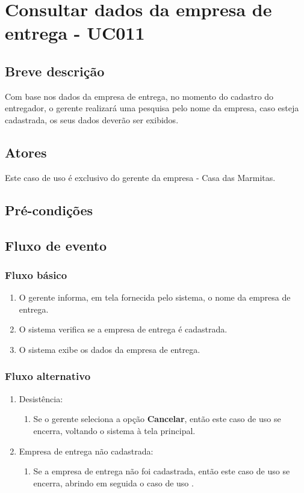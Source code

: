 \chapter{Consultar dados da empresa de entrega - UC011} \label{uc011}

\section{Breve descrição}

Com base nos dados da empresa de entrega, no momento do cadastro do entregador, o gerente realizará uma pesquisa pelo nome da empresa, caso esteja cadastrada, os seus dados deverão ser exibidos.

\section{Atores}

Este caso de uso é exclusivo do gerente da empresa - Casa das Marmitas.

\section{Pré-condições}

\section{Fluxo de evento}

\subsection{Fluxo básico}

\begin{enumerate}
	\item O gerente informa, em tela fornecida pelo sistema, o nome da empresa de entrega.	
	\item O sistema verifica se a empresa de entrega é cadastrada.
	\item O sistema exibe os dados da empresa de entrega.
\end{enumerate}

\subsection{Fluxo alternativo}

\begin{enumerate}
	\item Desistência:
	\begin{enumerate}
		\item Se o gerente seleciona a opção \textbf{Cancelar}, então este caso de uso se encerra, voltando o sistema à tela principal.
	\end{enumerate}
	\item Empresa de entrega não cadastrada:
	\begin{enumerate}
		\item Se a empresa de entrega não foi cadastrada, então este caso de uso se encerra, abrindo em seguida o caso de uso .
	\end{enumerate}
\end{enumerate}

